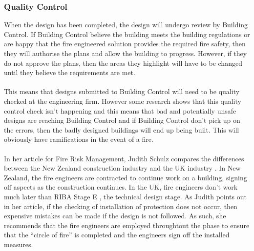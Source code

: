 \documentclass[table,a4paper,oneside]{book}
\begin{document}
\subsubsection{Quality Control}
When the design has been completed, the design will undergo review by Building Control. If Building Control believe the building meets the building regulations or are happy that the fire engineered solution provides the required fire safety, then they will authorise the plans and allow the building to progress. However, if they do not approve the plans, then the areas they highlight will have to be changed until they believe the requirements are met.
\\
\\
This means that designs submitted to Building Control will need to be quality checked at the engineering firm. However some research shows that this quality control check isn't happening \citep{JohanLundin02012005} and this means that bad and potentially unsafe designs are reaching Building Control and if Building Control don't pick up on the errors, then the badly designed buildings will end up being built. This will obviously have ramifications in the event of a fire.
\\
\\
In her article for Fire Risk Management, Judith Schulz compares the differences between the New Zealand construction industry and the UK industry \citep{Schulz2009}. In New Zealand, the fire engineers are contracted to continue work on a building, signing off aspects as the construction continues. In the UK, fire engineers don't work much later than RIBA Stage E \citep{RIBA2008}, the technical design stage. As Judith points out in her article, if the checking of installation of protection does not occur, then expensive mistakes can be made if the design is not followed. As such, she recommends that the fire engineers are employed throughtout the phase to ensure that the ``circle of fire'' is completed and the engineers sign off the installed measures.
\end{document}
